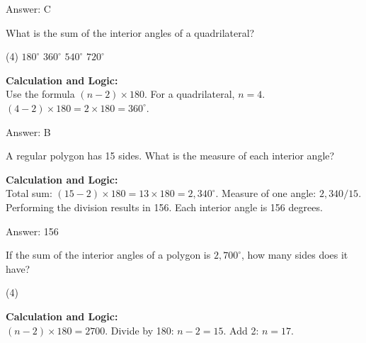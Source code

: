 \documentclass[11pt,paper=a4,answers]{exam}
\begin{document}
\begin{questions}
\begin{solution}
\vspace{30pt}

Answer: \colorbox{yellow!100}{C}
\end{solution}

\vspace{60pt}

\question
What is the sum of the interior angles of a quadrilateral?
\begin{tasks}(4)
    \task $180^\circ$
    \task $360^\circ$
    \task $540^\circ$
    \task $720^\circ$
\end{tasks}

\begin{solution}
\textbf{Calculation and Logic:} \\
Use the formula $(n - 2) \times 180$. For a quadrilateral, $n = 4$. $(4 - 2) \times 180 = 2 \times 180 = 360^\circ$.

\vspace{30pt}

Answer: \colorbox{yellow!100}{B}
\end{solution}

\vspace{60pt}

\question
A regular polygon has 15 sides. What is the measure of each interior angle?

\begin{solution}
\textbf{Calculation and Logic:} \\
Total sum: $(15 - 2) \times 180 = 13 \times 180 = 2,340^\circ$. Measure of one angle: $2,340 / 15$. Performing the division results in 156. Each interior angle is 156 degrees.

\vspace{30pt}

Answer: \colorbox{yellow!100}{156}
\end{solution}

\vspace{60pt}

\question
If the sum of the interior angles of a polygon is $2,700^\circ$, how many sides does it have?
\begin{tasks}(4)
\end{tasks}

\begin{solution}
\textbf{Calculation and Logic:} \\
$(n - 2) \times 180 = 2700$. Divide by 180: $n - 2 = 15$. Add 2: $n = 17$.


\end{solution}
\end{questions}
\end{document}
